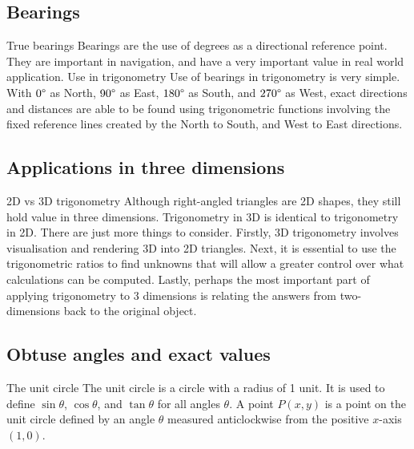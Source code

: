 \begin{outline}
\0
\subsection{Bearings}
	\1 True bearings
		\2 Bearings are the use of degrees as a directional reference point. They are important in navigation, and have a very important value in real world application.
	\1 Use in trigonometry
		\2 Use of bearings in trigonometry is very simple. With $0\degree$ as North, $90\degree$ as East, $180\degree$ as South, and $270\degree$ as West, exact directions and distances are able to be found using trigonometric functions involving the fixed reference lines created by the North to South, and West to East directions.

\0
\subsection{Applications in three dimensions}
	\1 2D vs 3D trigonometry
		\2 Although right-angled triangles are 2D shapes, they still hold value in three dimensions. Trigonometry in 3D is identical to trigonometry in 2D. There are just more things to consider. Firstly, 3D trigonometry involves visualisation and rendering 3D into 2D triangles. Next, it is essential to use the trigonometric ratios to find unknowns that will allow a greater control over what calculations can be computed. Lastly, perhaps the most important part of applying trigonometry to 3 dimensions is relating the answers from two-dimensions back to the original object.

\0
\subsection{Obtuse angles and exact values}
	\1 The unit circle
		\2 The unit circle is a circle with a radius of 1 unit. It is used to define $\sin\theta$, $\cos\theta$, and $\tan\theta$ for all angles $\theta$. A point $P(x, y)$ is a point on the unit circle defined by an angle $\theta$ measured anticlockwise from the positive $x$-axis $(1, 0)$.
\begin{center}
\end{center}
\end{outline}
